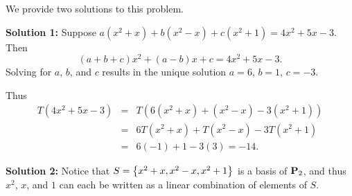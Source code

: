 \begin{solution}
  We provide two solutions to this problem.

  \textbf{Solution 1:}
  Suppose $a(x^2+x) + b(x^2-x) + c(x^2+1) = 4x^2+5x-3$.  Then
  \begin{equation*} (a+b+c)x^2 + (a-b)x + c = 4x^2+5x-3.\end{equation*}
  Solving for $a$, $b$, and $c$ results in the unique solution
  $a=6$, $b=1$, $c=-3$.

  Thus
  \begin{eqnarray*}
    T(4x^2+5x-3)
    & = & T(6(x^2+x) + (x^2-x) -3(x^2+1)) \\
    & = & 6T(x^2+x) + T(x^2-x) -3T(x^2+1) \\
    & = & 6(-1) + 1 -3(3) = -14.
  \end{eqnarray*}

  \textbf{Solution 2:}
  Notice that $S=\left\{x^2+x, x^2-x, x^2+1\right\}$ is a basis of $\mathbf{P}_2$,
  and thus $x^2$, $x$, and $1$ can each be written as a linear
  combination of elements of $S$.


\end{solution}
